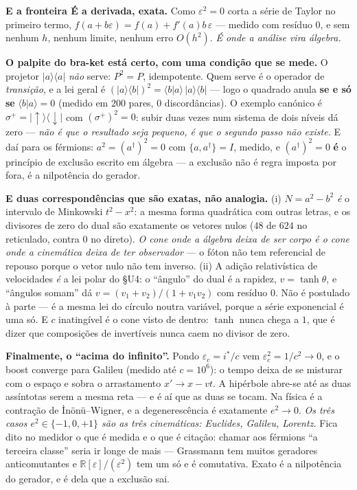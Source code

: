 \documentclass[11pt]{article}
\newcommand{\R}{\mathbb R}
\theoremstyle{plain}
\theoremstyle{remark}
\begin{document}
\begin{itemize}
\textbf{E a fronteira É a derivada, exata.} Como $\varepsilon^2=0$ corta a série de Taylor no
primeiro termo, $f(a+b\varepsilon)=f(a)+f'(a)b\,\varepsilon$ --- medido com resíduo $0$, e sem
nenhum $h$, nenhum limite, nenhum erro $O(h^2)$. \emph{É onde a análise vira álgebra.}

\textbf{O palpite do bra-ket está certo, com uma condição que se mede.} O projetor $|a\rangle\langle a|$
\emph{não} serve: $P^2=P$, idempotente. Quem serve é o operador de \emph{transição}, e a lei geral
é $(|a\rangle\langle b|)^2=\langle b|a\rangle\,|a\rangle\langle b|$ --- logo o quadrado anula \textbf{se e só se}
$\langle b|a\rangle=0$ (medido em $200$ pares, $0$ discordâncias). O exemplo canónico é $\sigma^+ =
|{\uparrow}\rangle\langle{\downarrow}|$ com $(\sigma^+)^2=0$: subir duas vezes num sistema de dois níveis dá
zero --- \emph{não é que o resultado seja pequeno, é que o segundo passo não existe.} E daí para os
férmions: $a^2=(a^\dagger)^2=0$ com $\{a,a^\dagger\}=I$, medido, e $(a^\dagger)^2=0$ \textbf{é} o
princípio de exclusão escrito em álgebra --- a exclusão não é regra imposta por fora, é a
nilpotência do gerador.

\textbf{E duas correspondências que são exatas, não analogia.} (i) $N=a^2-b^2$ \emph{é} o intervalo
de Minkowski $t^2-x^2$: a mesma forma quadrática com outras letras, e os divisores de zero do dual
são exatamente os vetores nulos ($48$ de $624$ no reticulado, contra $0$ no direto). \emph{O cone
onde a álgebra deixa de ser corpo é o cone onde a cinemática deixa de ter observador} --- o fóton
não tem referencial de repouso porque o vetor nulo não tem inverso. (ii) A adição relativística de
velocidades \emph{é} a lei polar do §U4: o ``ângulo'' do dual é a rapidez, $v=\tanh\theta$, e
``ângulos somam'' dá $v=(v_1+v_2)/(1+v_1v_2)$ com resíduo $0$. Não é postulado à parte --- é a
mesma lei do círculo noutra variável, porque a série exponencial é uma só. E $c$ inatingível é o
cone visto de dentro: $\tanh$ nunca chega a $1$, que é dizer que composições de invertíveis nunca
caem no divisor de zero.

\textbf{Finalmente, o ``acima do infinito''.} Pondo $\varepsilon_c=i^*/c$ vem
$\varepsilon_c^2=1/c^2\to0$, e o boost converge para Galileu (medido até $c=10^6$): o tempo deixa de
se misturar com o espaço e sobra o arrastamento $x'\to x-vt$. A hipérbole abre-se até as duas
assíntotas serem a mesma reta --- e é aí que as duas se tocam. Na física é a contração de
İnönü--Wigner, e a degenerescência é exatamente $e^2\to0$. \emph{Os três casos $e^2\in\{-1,0,+1\}$
são as três cinemáticas: Euclides, Galileu, Lorentz.} Fica dito no medidor o que é medida e o que é
citação: chamar aos férmions ``a terceira classe'' seria ir longe de mais --- Grassmann tem muitos
geradores anticomutantes e $\R[\varepsilon]/(\varepsilon^2)$ tem um só e é comutativa. Exato é a
nilpotência do gerador, e é dela que a exclusão sai.


\end{itemize}
\end{document}
